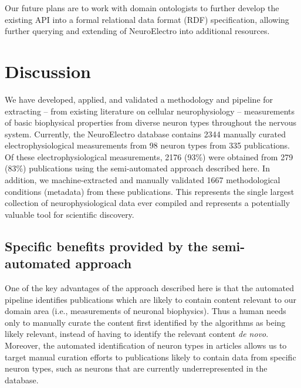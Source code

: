\documentclass{template/frontiersSCNS} %
\begin{document}
Our future plans are to work with domain ontologists to further develop the existing API into a formal relational data format (RDF) specification, allowing further querying and extending of NeuroElectro into additional resources.

\section{Discussion}

We have developed, applied, and validated a methodology and pipeline for extracting -- from existing literature on cellular neurophysiology -- measurements of basic biophysical properties from diverse neuron types throughout the nervous system.  
Currently, the NeuroElectro database contains 2344 manually curated electrophysiological measurements from 98 neuron types from 335 publications.  
Of these electrophysiological measurements, 2176 (93\%) were obtained from 279 (83\%) publications using the semi-automated approach described here.  
In addition, we machine-extracted and manually validated 1667 methodological conditions (metadata) from these publications.  
This represents the single largest collection of neurophysiological data ever compiled and represents a potentially valuable tool for scientific discovery.

\subsection{Specific benefits provided by the semi-automated approach}
One of the key advantages of the approach described here is that the automated pipeline identifies publications which are likely to contain content relevant to our domain area (i.e., measurements of neuronal biophysics).  
Thus a human needs only to manually curate the content first identified by the algorithms as being likely relevant, instead of having to identify the relevant content \emph{de novo}.  
Moreover, the automated identification of neuron types in articles allows us to target manual curation efforts to publications likely to contain data from specific neuron types, such as neurons that are currently underrepresented in the database.
\end{document}
